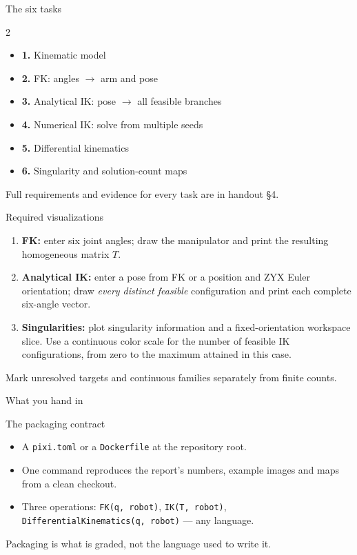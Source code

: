 \documentclass[aspectratio=169]{beamer}
\begin{document}
\begin{frame}[t]{The six tasks}
    \begin{multicols}{2}
        \begin{itemize}
            \item \textbf{1.} Kinematic model
            \item \textbf{2.} FK: angles $\to$ arm and pose
            \item \textbf{3.} Analytical IK: pose $\to$ all feasible branches
            \item \textbf{4.} Numerical IK: solve from multiple seeds
            \item \textbf{5.} Differential kinematics
            \item \textbf{6.} Singularity and solution-count maps
        \end{itemize}
    \end{multicols}
    \medskip

    Full requirements and evidence for every task are in handout \S4.
\end{frame}

\begin{frame}[t]{Required visualizations}
    \begin{enumerate}
        \item \textbf{FK:} enter six joint angles; draw the manipulator and print
              the resulting homogeneous matrix $T$.
        \item \textbf{Analytical IK:} enter a pose from FK or a position and
              ZYX Euler orientation; draw \emph{every distinct feasible}
              configuration and print each complete six-angle vector.
        \item \textbf{Singularities:} plot singularity information and a
              fixed-orientation workspace slice. Use a continuous color
              scale for the number of feasible IK configurations, from
              zero to the maximum attained in this case.
    \end{enumerate}
    Mark unresolved targets and continuous families separately from finite counts.
\end{frame}

\begin{frame}[t]{What you hand in}
    \begin{block}{The packaging contract}
        \begin{itemize}
            \item A \texttt{pixi.toml} or a \texttt{Dockerfile} at the repository root.
            \item One command reproduces the report's numbers, example images and
                  maps from a clean checkout.
            \item Three operations: \texttt{FK(q, robot)},
                  \texttt{IK(T, robot)}, \texttt{DifferentialKinematics(q, robot)}
                  --- any language.
        \end{itemize}
    \end{block}
    \medskip

    Packaging is what is graded, not the language used to write it.
\end{frame}
\end{document}
